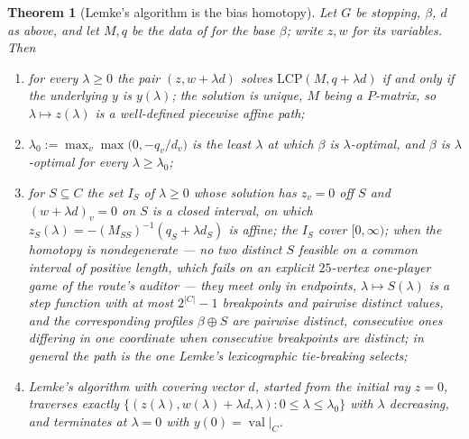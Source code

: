 \documentclass[11pt]{article}
\theoremstyle{plain}
\newtheorem{theorem}{Theorem}[section]
\theoremstyle{definition}
\DeclareMathOperator{\val}{val}
\begin{document}
\begin{theorem}[Lemke's algorithm is the bias homotopy]\label{thm:lemke-homotopy}
Let $G$ be stopping, $\beta$, $d$ as above, and let $M,q$ be the data of
 for the base $\beta$; write $z,w$ for its variables. Then
\begin{enumerate}[label=(\alph*),leftmargin=2.2em]
\item for every $\lambda\ge0$ the pair $(z,w+\lambda d)$ solves
  $\mathrm{LCP}(M,q+\lambda d)$ if and only if the underlying $y$ is
  $y(\lambda)$; the solution is unique, $M$ being a $P$-matrix, so
  $\lambda\mapsto z(\lambda)$ is a well-defined piecewise affine path;
\item $\lambda_0:=\max_v\max\bigl(0,-q_v/d_v\bigr)$ is the least $\lambda$ at
  which $\beta$ is $\lambda$-optimal, and $\beta$ is $\lambda$-optimal for
  every $\lambda\ge\lambda_0$;
\item for $S\subseteq C$ the set $I_S$ of $\lambda\ge0$ whose solution has
  $z_v=0$ off $S$ and $(w+\lambda d)_v=0$ on $S$ is a closed interval, on
  which $z_S(\lambda)=-(M_{SS})^{-1}(q_S+\lambda d_S)$ is affine; the $I_S$
  cover $[0,\infty)$; when the homotopy is \emph{nondegenerate} --- no two
  distinct $S$ feasible on a common interval of positive length, which
  fails on an explicit $25$-vertex one-player game of the route's auditor
  --- they meet only in endpoints, $\lambda\mapsto S(\lambda)$ is a step
  function with at most $2^{|C|}-1$ breakpoints and pairwise distinct
  values, and the corresponding profiles $\beta\oplus S$ are pairwise
  distinct, consecutive ones differing in one coordinate when consecutive
  breakpoints are distinct; in general the path is the one Lemke's
  lexicographic tie-breaking selects;
\item Lemke's algorithm with covering vector $d$, started from the initial
  ray $z=0$, traverses exactly
  $\{(z(\lambda),w(\lambda)+\lambda d,\lambda):0\le\lambda\le\lambda_0\}$
  with $\lambda$ decreasing, and terminates at $\lambda=0$ with
  $y(0)=\val|_C$.
\end{enumerate}
\end{theorem}
\end{document}
